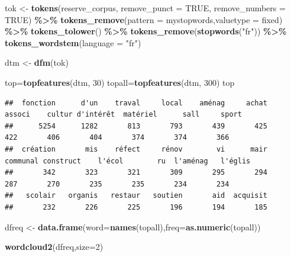 \documentclass[
]{book}
\newenvironment{Shaded}{\begin{snugshade}}{\end{snugshade}}
\newcommand{\AttributeTok}[1]{\textcolor[rgb]{0.13,0.29,0.53}{#1}}
\newcommand{\ConstantTok}[1]{\textcolor[rgb]{0.56,0.35,0.01}{#1}}
\newcommand{\DecValTok}[1]{\textcolor[rgb]{0.00,0.00,0.81}{#1}}
\newcommand{\FunctionTok}[1]{\textcolor[rgb]{0.13,0.29,0.53}{\textbf{#1}}}
\newcommand{\NormalTok}[1]{#1}
\newcommand{\OtherTok}[1]{\textcolor[rgb]{0.56,0.35,0.01}{#1}}
\newcommand{\SpecialCharTok}[1]{\textcolor[rgb]{0.81,0.36,0.00}{\textbf{#1}}}
\newcommand{\StringTok}[1]{\textcolor[rgb]{0.31,0.60,0.02}{#1}}
\begin{document}
\begin{Shaded}
\begin{Highlighting}[]
\NormalTok{tok }\OtherTok{\textless{}{-}} \FunctionTok{tokens}\NormalTok{(reserve\_corpus, }\AttributeTok{remove\_punct =} \ConstantTok{TRUE}\NormalTok{, }\AttributeTok{remove\_numbers =} \ConstantTok{TRUE}\NormalTok{) }\SpecialCharTok{\%\textgreater{}\%}
  \FunctionTok{tokens\_remove}\NormalTok{(}\AttributeTok{pattern =}\NormalTok{ mystopwords,}\AttributeTok{valuetype =} \StringTok{\textquotesingle{}fixed\textquotesingle{}}\NormalTok{) }\SpecialCharTok{\%\textgreater{}\%}
  \FunctionTok{tokens\_tolower}\NormalTok{() }\SpecialCharTok{\%\textgreater{}\%}
  \FunctionTok{tokens\_remove}\NormalTok{(}\FunctionTok{stopwords}\NormalTok{(}\StringTok{"fr"}\NormalTok{)) }\SpecialCharTok{\%\textgreater{}\%}
  \FunctionTok{tokens\_wordstem}\NormalTok{(}\AttributeTok{language =} \StringTok{"fr"}\NormalTok{)}

\NormalTok{dtm }\OtherTok{\textless{}{-}} \FunctionTok{dfm}\NormalTok{(tok)}

\NormalTok{top}\OtherTok{=}\FunctionTok{topfeatures}\NormalTok{(dtm, }\DecValTok{30}\NormalTok{)}
\NormalTok{topall}\OtherTok{=}\FunctionTok{topfeatures}\NormalTok{(dtm, }\DecValTok{300}\NormalTok{)}
\NormalTok{top}
\end{Highlighting}
\end{Shaded}

\begin{verbatim}
##  fonction      d'un    traval     local    aménag     achat    associ    cultur d'intérêt  matériel      sall     sport 
##      5254      1282       813       793       439       425       422       406       404       374       374       366 
##  création       mis    réfect     rénov        vi      mair  communal construct    l'écol        ru  l'aménag   l'églis 
##       342       323       321       309       295       294       287       270       235       235       234       234 
##   scolair   organis   restaur   soutien       aid  acquisit 
##       232       226       225       196       194       185
\end{verbatim}

\begin{Shaded}
\begin{Highlighting}[]
\NormalTok{dfreq }\OtherTok{\textless{}{-}} \FunctionTok{data.frame}\NormalTok{(}\AttributeTok{word=}\FunctionTok{names}\NormalTok{(topall),}\AttributeTok{freq=}\FunctionTok{as.numeric}\NormalTok{(topall))}

\FunctionTok{wordcloud2}\NormalTok{(dfreq,}\AttributeTok{size=}\DecValTok{2}\NormalTok{)}
\end{Highlighting}
\end{Shaded}
\end{document}
